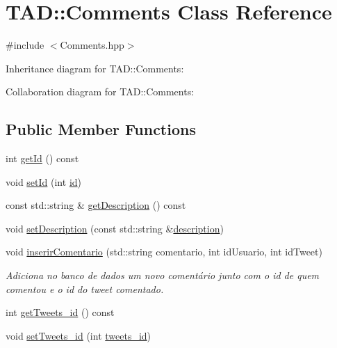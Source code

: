 \hypertarget{class_t_a_d_1_1_comments}{}\section{T\+AD\+:\+:Comments Class Reference}
\label{class_t_a_d_1_1_comments}


{\ttfamily \#include $<$Comments.\+hpp$>$}



Inheritance diagram for T\+AD\+:\+:Comments\+:


Collaboration diagram for T\+AD\+:\+:Comments\+:
\subsection*{Public Member Functions}
\begin{DoxyCompactItemize}
\item 
int \hyperlink{class_t_a_d_1_1_comments_a19713837395fe61765c8828e0ac6e2e4}{get\+Id} () const
\item 
void \hyperlink{class_t_a_d_1_1_comments_a37a51cc0959f4eaac5b94d0cc80f684c}{set\+Id} (int \hyperlink{class_t_a_d_1_1_comments_aa79c05cab480f12f13d9864b9791d972}{id})
\item 
const std\+::string \& \hyperlink{class_t_a_d_1_1_comments_a1d5be175dfd5907cc76f40cb6b3f9fe0}{get\+Description} () const
\item 
void \hyperlink{class_t_a_d_1_1_comments_afba65b422bcd9389111539ee4264be1f}{set\+Description} (const std\+::string \&\hyperlink{class_t_a_d_1_1_comments_a3b6ff92ac725fdee6c109036eebc889d}{description})
\item 
void \hyperlink{class_t_a_d_1_1_comments_a7d312da36b87d328983c2759d16452e2}{inserir\+Comentario} (std\+::string comentario, int id\+Usuario, int id\+Tweet)
\begin{DoxyCompactList}\small\item\em Adiciona no banco de dados um novo comentário junto com o id de quem comentou e o id do tweet comentado. \end{DoxyCompactList}\item 
int \hyperlink{class_t_a_d_1_1_comments_ab8a4d8631f22eac4d387a2d76eb8ebb9}{get\+Tweets\+\_\+id} () const
\item 
void \hyperlink{class_t_a_d_1_1_comments_a8bf8b446db4ea8aa9e5b4fd2b72e7c11}{set\+Tweets\+\_\+id} (int \hyperlink{class_t_a_d_1_1_comments_afbe4b492056ffa01d03c7ae846d50ea2}{tweets\+\_\+id})
\item 

\end{DoxyCompactItemize}
